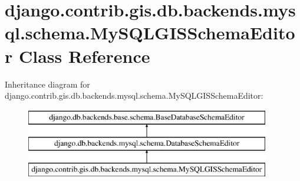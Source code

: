 \hypertarget{classdjango_1_1contrib_1_1gis_1_1db_1_1backends_1_1mysql_1_1schema_1_1_my_s_q_l_g_i_s_schema_editor}{}\section{django.\+contrib.\+gis.\+db.\+backends.\+mysql.\+schema.\+My\+S\+Q\+L\+G\+I\+S\+Schema\+Editor Class Reference}
\label{classdjango_1_1contrib_1_1gis_1_1db_1_1backends_1_1mysql_1_1schema_1_1_my_s_q_l_g_i_s_schema_editor}
Inheritance diagram for django.\+contrib.\+gis.\+db.\+backends.\+mysql.\+schema.\+My\+S\+Q\+L\+G\+I\+S\+Schema\+Editor\+:\begin{figure}[H]
\begin{center}
\leavevmode
\includegraphics[height=3.000000cm]{classdjango_1_1contrib_1_1gis_1_1db_1_1backends_1_1mysql_1_1schema_1_1_my_s_q_l_g_i_s_schema_editor}
\end{center}
\end{figure}
